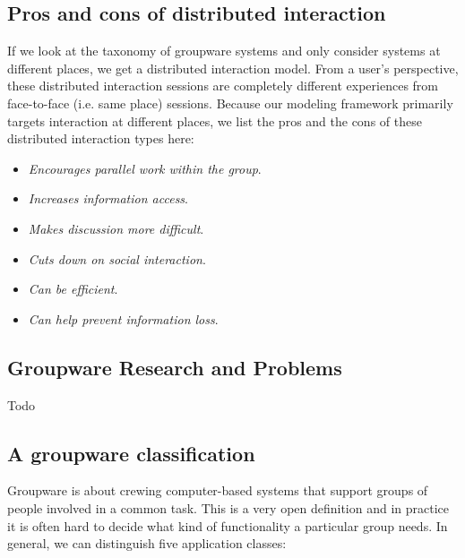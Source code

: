 \subsection{Pros and cons of distributed interaction}

If we look at the taxonomy of groupware systems and only consider systems at different places, we get a distributed interaction model. From a user's perspective, these distributed interaction sessions are completely different experiences from face-to-face (i.e. same place) sessions. Because our modeling framework primarily targets interaction at different places, we list the pros and the cons of these distributed interaction types here: 

\begin{itemize}
\item{\textit{Encourages parallel work within the group}. }
\item{\textit{Increases information access}. }
\item{\textit{Makes discussion more difficult}.}
\item{\textit{Cuts down on social interaction}.}
\item{\textit{Can be efficient}.}
\item{\textit{Can help prevent information loss}.}
\end{itemize}

\subsection{Groupware Research and Problems}

Todo

\subsection{A groupware classification}

Groupware is about crewing computer-based systems that support groups of people involved in a common task. This is a very open definition and in practice it is often hard to decide what kind of functionality a particular group needs. In general, we can distinguish five application classes:

